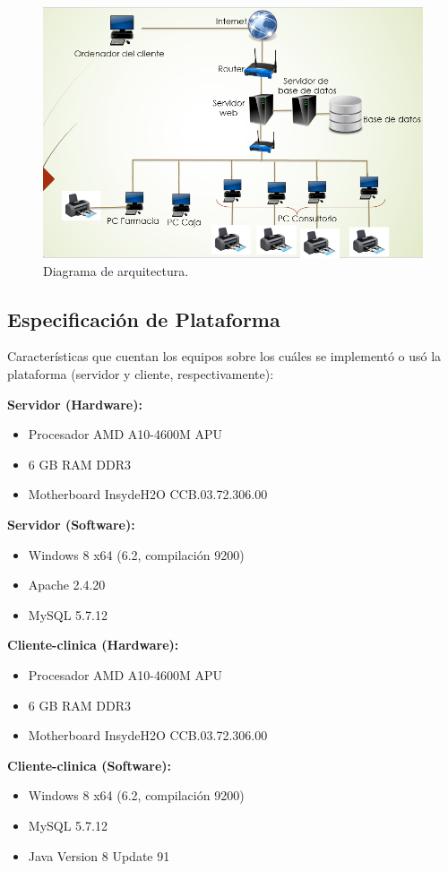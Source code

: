 	\begin{figure}[htbp!]
		\centering
			\includegraphics[width=1.15\textwidth]{images/mod_fis3.png}
		\caption{Diagrama de arquitectura.}
	\end{figure}



\subsection{Especificación de Plataforma}
Caracter\'isticas que cuentan los equipos sobre los cu\'ales se implement\'o o us\'o la plataforma (servidor y cliente, respectivamente):


\bfseries Servidor (Hardware): \mdseries
\begin{itemize}
\item Procesador AMD A10-4600M APU
\item 6 GB RAM DDR3
\item Motherboard InsydeH2O CCB.03.72.306.00
\end{itemize}

\bfseries Servidor (Software): \mdseries
\begin{itemize}
\item Windows 8 x64 (6.2, compilaci\'on 9200)
\item Apache 2.4.20
\item MySQL 5.7.12
\end{itemize}

\bfseries Cliente-clinica (Hardware): \mdseries
\begin{itemize}
\item Procesador AMD A10-4600M APU
\item 6 GB RAM DDR3
\item Motherboard InsydeH2O CCB.03.72.306.00
\end{itemize}

\bfseries Cliente-clinica (Software): \mdseries
\begin{itemize}
\item Windows 8 x64 (6.2, compilaci\'on 9200)
\item MySQL 5.7.12
\item Java Version 8 Update 91
\end{itemize}

